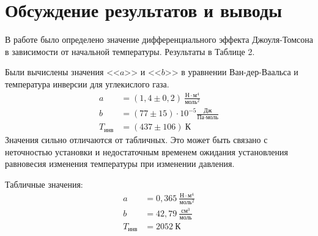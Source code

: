\documentclass[a4paper,12pt]{article}
\theoremstyle{plain} %
\theoremstyle{definition} %
\theoremstyle{remark} %
\begin{document}
\section{Обсуждение результатов и выводы}
В работе было определено значение дифференциального эффекта Джоуля-Томсона в зависимости от начальной температуры. Результаты в Таблице 2.

Были вычислены значения <<$a$>> и <<$b$>>  в уравнении Ван-дер-Ваальса и температура инверсии для углекислого газа.
\begin{equation*}
\begin{aligned}
	a &= (1,4\pm0,2)\  \tfrac{\text{Н}\cdot\text{м}^4}{\text{моль}^2} \\
	b& = (77\pm15)  \cdot 10^{-5} \tfrac{\text{Дж}}{\text{Па} \cdot \text{моль}}\\
	T_\text{инв}  &= (437\pm106) \ \text{К}
\end{aligned}
\end{equation*}
Значения сильно отличаются от табличных. Это может быть связано с неточностью установки и недостаточным временем ожидания установления равновесия изменения температуры при изменении давления.

Табличные значения:
\begin{equation*}
\begin{aligned}
a &= 0,365\  \tfrac{\text{Н}\cdot\text{м}^4}{\text{моль}^2} \\
b& = 42,79\  \tfrac{\text{см}^3}{\text{моль}}\\
T_\text{инв}  &= 2052 \ \text{К}
\end{aligned}
\end{equation*}
\end{document}

